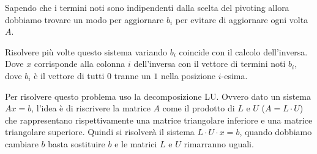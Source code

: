 Sapendo che i termini noti sono indipendenti dalla scelta del pivoting allora
dobbiamo trovare un modo per aggiornare $b_i$ per evitare di aggiornare ogni
volta $A$.
\begin{osservazione}
    Risolvere più volte questo sistema variando $b_i$ coincide con il calcolo
    dell'inversa. Dove $x$ corrisponde alla colonna $i$ dell'inversa con il
    vettore di termini noti $b_i$, dove $b_i$ è il vettore di tutti $0$ tranne
    un $1$ nella posizione $i$-esima.
\end{osservazione}
Per risolvere questo problema uso la decomposizione LU. Ovvero dato un sistema
$Ax=b$, l'idea è di riscrivere la matrice $A$ come il prodotto di $L$ e $U$ ($A
    = L \cdot U$) che rappresentano rispettivamente una matrice triangolare
inferiore e una matrice triangolare superiore. Quindi si risolverà il sistema $L
    \cdot U \cdot x = b$, quando dobbiamo cambiare $b$ basta sostituire $b$ e le
matrici $L$ e $U$ rimarranno uguali.

